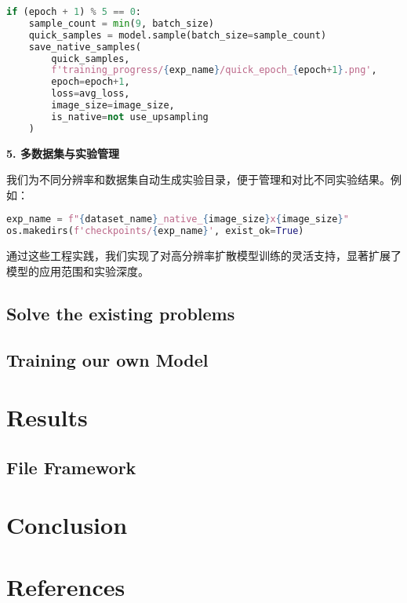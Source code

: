 \documentclass{ctexart}
\begin{document}
\begin{lstlisting}[language=python]
if (epoch + 1) % 5 == 0:
    sample_count = min(9, batch_size)
    quick_samples = model.sample(batch_size=sample_count)
    save_native_samples(
        quick_samples,
        f'training_progress/{exp_name}/quick_epoch_{epoch+1}.png',
        epoch=epoch+1,
        loss=avg_loss,
        image_size=image_size,
        is_native=not use_upsampling
    )
\end{lstlisting}

\vspace{0.5em}
\noindent
\textbf{5. 多数据集与实验管理}

我们为不同分辨率和数据集自动生成实验目录，便于管理和对比不同实验结果。例如：

\begin{lstlisting}[language=python]
exp_name = f"{dataset_name}_native_{image_size}x{image_size}"
os.makedirs(f'checkpoints/{exp_name}', exist_ok=True)
\end{lstlisting}

\vspace{0.5em}
\noindent
通过这些工程实践，我们实现了对高分辨率扩散模型训练的灵活支持，显著扩展了模型的应用范围和实验深度。

\subsection{Solve the existing problems}

\subsection{Training our own Model}

\section{Results}

\subsection{File Framework}


\section{Conclusion}


\section{References}

    
\end{document}
